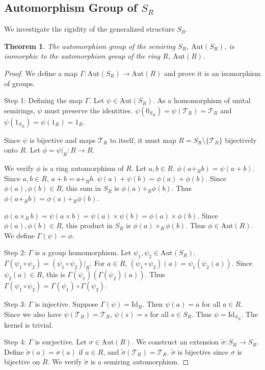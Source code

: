 \documentclass[11pt, a4paper]{article}
\theoremstyle{plain}
\newtheorem{theorem}{Theorem}[section]
\theoremstyle{definition}
\numberwithin{equation}{section}
\newcommand{\Tobj}{\mathcal{T}} %
\newcommand{\Aut}{\mathrm{Aut}}
\newcommand{\Id}{\mathrm{Id}}
\newcommand{\SR}{S_{R}}
\begin{document}
\subsection{Automorphism Group of \texorpdfstring{$\SR$}{S\_R}}

We investigate the rigidity of the generalized structure $\SR$.

\begin{theorem}\label{thm:aut_SR}
The automorphism group of the semiring $\SR$, $\Aut(\SR)$, is isomorphic to the automorphism group of the ring $R$, $\Aut(R)$.
\end{theorem}
\begin{proof}
We define a map $\Gamma: \Aut(\SR) \to \Aut(R)$ and prove it is an isomorphism of groups.

Step 1: Defining the map $\Gamma$.
Let $\psi \in \Aut(\SR)$. As a homomorphism of unital semirings, $\psi$ must preserve the identities. $\psi(0_{\SR})=\psi(\Tobj_R)=\Tobj_R$ and $\psi(1_{\SR})=\psi(1_{R})=1_{R}$.

Since $\psi$ is bijective and maps $\Tobj_R$ to itself, it must map $R=\SR\setminus\{\Tobj_R\}$ bijectively onto $R$. Let $\phi = \psi|_{R}: R \to R$.

We verify $\phi$ is a ring automorphism of $R$. Let $a, b \in R$.
$\phi(a+_{R} b) = \psi(a+b)$. Since $a, b \in R$, $a+b=a+_R b$.
$\psi(a)+\psi(b) = \phi(a)+\phi(b)$. Since $\phi(a), \phi(b) \in R$, this sum in $\SR$ is $\phi(a)+_R\phi(b)$.
Thus $\phi(a+_{R} b) = \phi(a)+_{R}\phi(b)$.

$\phi(a\times_{R} b) = \psi(a\times b) = \psi(a)\times\psi(b) = \phi(a)\times\phi(b)$. Since $\phi(a), \phi(b) \in R$, this product in $\SR$ is $\phi(a)\times_R\phi(b)$.
Thus $\phi \in \Aut(R)$. We define $\Gamma(\psi) = \phi$.

Step 2: $\Gamma$ is a group homomorphism.
Let $\psi_1, \psi_2 \in \Aut(\SR)$. $\Gamma(\psi_1 \circ \psi_2) = (\psi_1 \circ \psi_2)|_{R}$.
For $a \in R$, $(\psi_1 \circ \psi_2)(a) = \psi_1(\psi_2(a))$. Since $\psi_2(a) \in R$, this is $\Gamma(\psi_1)(\Gamma(\psi_2)(a))$.
Thus $\Gamma(\psi_1 \circ \psi_2) = \Gamma(\psi_1) \circ \Gamma(\psi_2)$.

Step 3: $\Gamma$ is injective.
Suppose $\Gamma(\psi) = \Id_{R}$. Then $\psi(a)=a$ for all $a \in R$. Since we also have $\psi(\Tobj_R)=\Tobj_R$, $\psi(s)=s$ for all $s \in \SR$. Thus $\psi=\Id_{\SR}$. The kernel is trivial.

Step 4: $\Gamma$ is surjective.
Let $\sigma \in \Aut(R)$. We construct an extension $\tilde{\sigma}: \SR \to \SR$.
Define $\tilde{\sigma}(a) = \sigma(a)$ if $a \in R$, and $\tilde{\sigma}(\Tobj_R) = \Tobj_R$.
$\tilde{\sigma}$ is bijective since $\sigma$ is bijective on $R$. We verify $\tilde{\sigma}$ is a semiring automorphism.


\end{proof}
\end{document}
